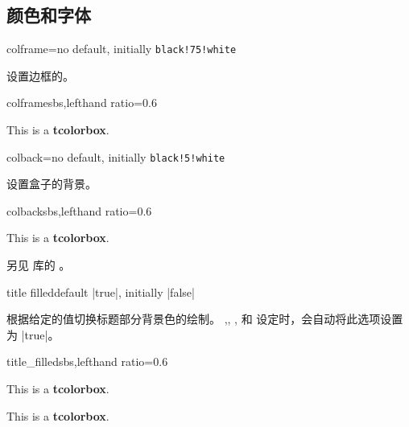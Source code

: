   

\subsection{颜色和字体}
\begin{docTcbKey}{colframe}{=}{no default, initially \texttt{black!75!white}}

设置边框的。
\begin{exdispExample*}{colframe}{sbs,lefthand ratio=0.6}
\begin{tcolorbox}[colframe=red!50!white]
This is a \textbf{tcolorbox}.
\end{tcolorbox}
\end{exdispExample*}
\end{docTcbKey}

\begin{docTcbKey}{colback}{=}{no default, initially \texttt{black!5!white}}

设置盒子的背景。
\begin{exdispExample*}{colback}{sbs,lefthand ratio=0.6}
\begin{tcolorbox}[colback=red!50!white]
This is a \textbf{tcolorbox}.
\end{tcolorbox}
\end{exdispExample*}
\end{docTcbKey}

另见  库的 。

\begin{docTcbKey}{title filled}{}{default |true|, initially |false|}

根据给定的值切换标题部分背景色的绘制。
,, ,
和  设定时，会自动将此选项设置为 |true|。

\begin{exdispExample*}{title_filled}{sbs,lefthand ratio=0.6}
\begin{tcolorbox}[title=My title,title filled]
This is a \textbf{tcolorbox}.
\end{tcolorbox}
\begin{tcolorbox}[title=My title,
title filled=false]
This is a \textbf{tcolorbox}.
\end{tcolorbox}
\end{exdispExample*}
\end{docTcbKey}


